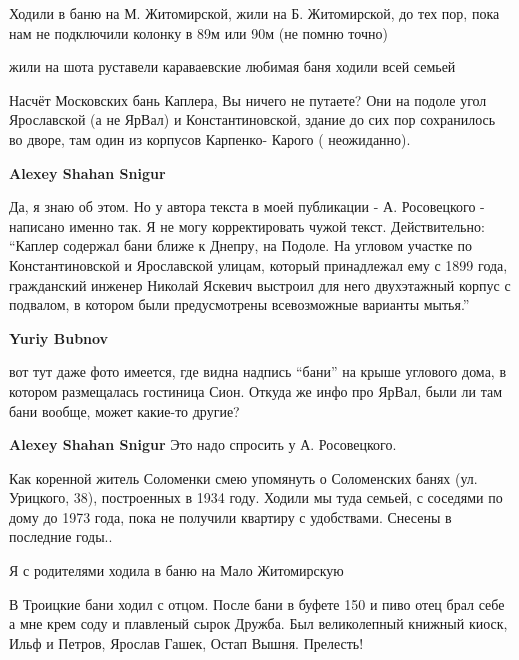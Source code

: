 \begin{itemize}

Ходили в баню на М. Житомирской, жили на Б. Житомирской, до тех пор, пока нам
не подключили колонку в 89м или 90м (не помню точно)


жили на шота руставели караваевские любимая баня ходили всей семьей


Насчёт Московских бань Каплера, Вы ничего не путаете? Они на подоле угол
Ярославской (а не ЯрВал) и Константиновской, здание до сих пор сохранилось во
дворе, там один из корпусов Карпенко- Карого ( неожиданно).

\begin{itemize} %
\textbf{Alexey Shahan Snigur} 

Да, я знаю об этом. Но у автора текста в моей публикации - А. Росовецкого -
написано именно так. Я не могу корректировать чужой текст. Действительно:
\enquote{Каплер содержал бани ближе к Днепру, на Подоле. На угловом участке по
Константиновской и Ярославской улицам, который принадлежал ему с 1899 года,
гражданский инженер Николай Яскевич выстроил для него двухэтажный корпус с
подвалом, в котором были предусмотрены всевозможные варианты мытья.}

\textbf{Yuriy Bubnov} 

вот тут даже фото имеется, где видна надпись \enquote{бани} на крыше углового дома, в
котором размещалась гостиница Сион. Откуда же инфо про ЯрВал, были ли там бани
вообще, может какие-то другие?

\textbf{Alexey Shahan Snigur} Это надо спросить у А. Росовецкого.

\end{itemize} %


Как коренной житель Соломенки смею упомянуть о Соломенских банях
(ул. Урицкого, 38), построенных в 1934 году. Ходили мы туда семьей, с соседями по
дому до 1973 года, пока не получили квартиру с удобствами. Снесены в последние
годы..

Я с родителями ходила в баню на Мало Житомирскую


В Троицкие бани ходил с отцом. После бани в буфете 150 и пиво отец брал себе а
мне крем соду и плавленый сырок Дружба. Был великолепный книжный киоск, Ильф и
Петров, Ярослав Гашек, Остап Вышня. Прелесть!


\end{itemize}
